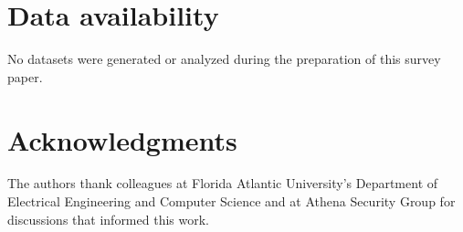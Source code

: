 \documentclass[unnumsec,webpdf,contemporary,large]{oup-authoring-template}
\theoremstyle{thmstyleone}
\theoremstyle{thmstyletwo}
\theoremstyle{thmstylethree}
\begin{document}
\section{Data availability}
No datasets were generated or analyzed during the preparation of this survey paper.

\section{Acknowledgments}
The authors thank colleagues at Florida Atlantic University's Department of Electrical Engineering and Computer Science and at Athena Security Group for discussions that informed this work.




\end{document}
